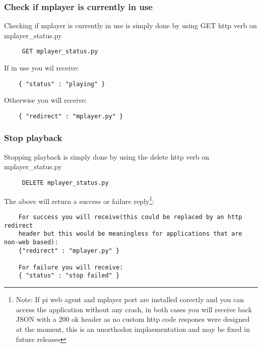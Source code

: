 \documentclass[12pt]{article}
\begin{document}
   \subsubsection{Check if mplayer is currently in use}
    Checking if mplayer is currently in use is simply done by using GET http verb on mplayer\_status.py
    \begin{verbatim}
     GET mplayer_status.py
    \end{verbatim}
    If in use you wil receive:
    \begin{verbatim}
    { "status" : "playing" }
    \end{verbatim}
     Otherwise you will receive:
    \begin{verbatim}
    { "redirect" : "mplayer.py" }
    \end{verbatim}
   \subsubsection{Stop playback }
    Stopping  playback is simply done by using the delete http verb on mplayer\_status.py
    
    \begin{verbatim}
     DELETE mplayer_status.py
    \end{verbatim}
     The above will return a success or failure reply\footnote{Note: If pi web agent and mplayer port are
     installed corectly and you can access the application without any crash, in both cases you will receive back JSON with a 200 ok header as no custom http code
     respones were designed at the moment, this is an unorthodox implaementation  and may be fixed in future
     releases}:
    \begin{verbatim}
    For success you will receive(this could be replaced by an http redirect 
    header but this would be meaningless for applications that are non-web based):
    {"redirect" : "mplayer.py" }
  
    For failure you will receive:
    { "status" : "stop failed" }
    \end{verbatim}




    
\end{document}
